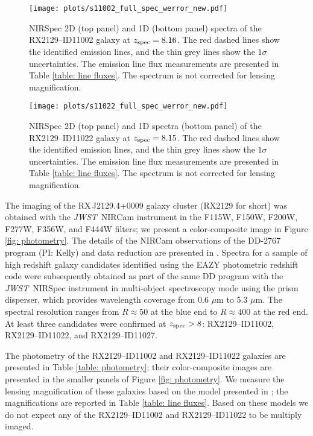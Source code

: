 \documentclass[twocolumn]{aastex631}
\newcommand{\jwst}{{\em JWST}}
\begin{document}
\begin{figure*}
    \centering
    \texttt{[image: plots/s11002\_full\_spec\_werror\_new.pdf]}
    \caption{NIRSpec 2D (top panel) and 1D (bottom panel) spectra of the RX2129--ID11002 galaxy at $z_{\textnormal{spec}} = 8.16$. The red dashed lines show the identified emission lines, and the thin grey lines show the $1\sigma$ uncertainties. The emission line flux measurements are presented in Table \ref{table: line fluxes}. The spectrum is not corrected for lensing magnification.}
    \label{fig: spectra 11002}
\end{figure*}

\begin{figure*}
    \centering
    \texttt{[image: plots/s11022\_full\_spec\_werror\_new.pdf]}
    \caption{NIRSpec 2D (top panel) and 1D spectra (bottom panel) of the RX2129--ID11022 galaxy at $z_{\textnormal{spec}} = 8.15$. The red dashed lines show the identified emission lines, and the thin grey lines show the $1\sigma$ uncertainties. The emission line flux measurements are presented in Table \ref{table: line fluxes}. The spectrum is not corrected for lensing magnification.}
    \label{fig: spectra 11022}
\end{figure*}

The imaging of the RX\,J2129.4$+$0009 galaxy cluster (RX2129 for short) was obtained with the \jwst\ NIRCam instrument in the F115W, F150W, F200W, F277W, F356W, and F444W filters; we present a color-composite image in Figure \ref{fig: photometry}. The details of the NIRCam observations of the DD-2767 program (PI: Kelly) and data reduction are presented in \cite{williams+2022}. Spectra for a sample of high redshift galaxy candidates identified using the EAZY \citep{brammervandokkumcoppi08} photometric redshift code were subsequently obtained as part of the same DD program with the \jwst\ NIRSpec instrument in multi-object spectroscopy mode using the prism disperser, which provides wavelength coverage from 0.6 $\mu$m to 5.3 $\mu$m. The spectral resolution ranges from $R\approx 50$ at the blue end to $R \approx 400$ at the red end. At least three candidates were confirmed at $z_{\textnormal{\scriptsize spec}} > 8$: RX2129--ID11002, RX2129--ID11022, and RX2129--ID11027. 

The photometry of the RX2129--ID11002 and RX2129--ID11022 galaxies are presented in Table \ref{table: photometry}; their color-composite images are presented in the smaller panels of Figure \ref{fig: photometry}. We measure the lensing magnification of these galaxies based on the model presented in \cite{williams+2022} \citep[see also][]{caminha+2019, 2021MNRAS.508.1206J}; the magnifications are reported in Table \ref{table: line fluxes}. Based on these models we do not expect any of the RX2129--ID11002 and RX2129--ID11022 to be multiply imaged.  
\end{document}
